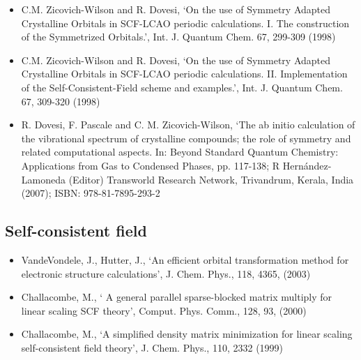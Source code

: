 \documentclass{report}
\begin{document}
\begin{itemize}
\item C.M. Zicovich-Wilson and R. Dovesi, `On the use of Symmetry Adapted Crystalline Orbitals in SCF-LCAO periodic calculations. I. The construction of the Symmetrized Orbitals.', Int. J. Quantum Chem. 67, 299-309 (1998)

\item C.M. Zicovich-Wilson and R. Dovesi, `On the use of Symmetry Adapted Crystalline Orbitals in SCF-LCAO periodic calculations. II. Implementation of the Self-Consistent-Field scheme and examples.', Int. J. Quantum Chem. 67, 309-320 (1998)

\item R. Dovesi, F. Pascale and C. M. Zicovich-Wilson, `The ab initio calculation of the vibrational spectrum of crystalline compounds; the role of symmetry and related computational aspects. In: Beyond Standard Quantum Chemistry: Applications from Gas to Condensed Phases, pp. 117-138;  R Hernández-Lamoneda (Editor) Transworld Research Network, Trivandrum, Kerala, India (2007); ISBN: 978-81-7895-293-2
\end{itemize}

\subsection{Self-consistent field}
\begin{itemize}
\item VandeVondele, J., Hutter, J., `An efficient orbital transformation method for electronic structure calculations', J. Chem. Phys., 118, 4365, (2003)

\item Challacombe, M., ` A general parallel sparse-blocked matrix multiply for linear scaling SCF theory', Comput. Phys. Comm., 128, 93, (2000)

\item Challacombe, M., `A simplified density matrix minimization for linear scaling self-consistent field theory', J. Chem. Phys., 110, 2332 (1999)
\end{itemize}
\end{document}
